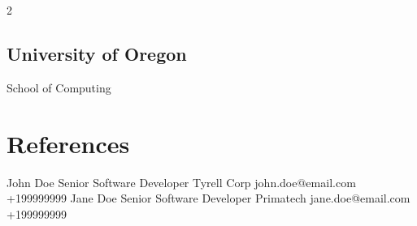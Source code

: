 \documentclass[]{plushcv}
\begin{document}
\begin{paracol}{2}
\sectionsep
\subsection{University of Oregon}
School of Computing \\
\sectionsep


\section{References}
  {John Doe}
  {Senior Software Developer}
  {Tyrell Corp}
  {john.doe@email.com}
  {+199999999}
\sectionsep
{}
  {Jane Doe}
  {Senior Software Developer}
  {Primatech}
  {jane.doe@email.com}
  {+199999999}






\end{paracol}
\end{document}
